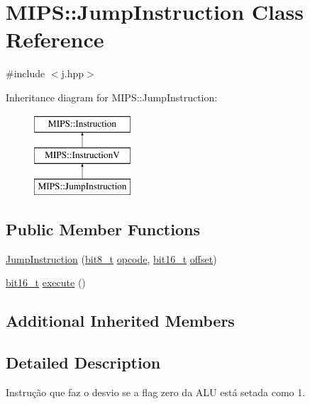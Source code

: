 \hypertarget{classMIPS_1_1JumpInstruction}{}\section{M\+I\+PS\+:\+:Jump\+Instruction Class Reference}
\label{classMIPS_1_1JumpInstruction}


{\ttfamily \#include $<$j.\+hpp$>$}

Inheritance diagram for M\+I\+PS\+:\+:Jump\+Instruction\+:\begin{figure}[H]
\begin{center}
\leavevmode
\includegraphics[height=3.000000cm]{classMIPS_1_1JumpInstruction}
\end{center}
\end{figure}
\subsection*{Public Member Functions}
\begin{DoxyCompactItemize}
\item 
\hyperlink{classMIPS_1_1JumpInstruction_a5688d5a7c2ded2c3b8a32cb395cb9db9}{Jump\+Instruction} (\hyperlink{core_8hpp_a6074bae122ae7b527864eec42c728c3c}{bit8\+\_\+t} \hyperlink{classMIPS_1_1Instruction_a45cc6808b5dde8a5d41067d148b55476}{opcode}, \hyperlink{core_8hpp_adc265a970bc35995b5879784bbb3f1b7}{bit16\+\_\+t} \hyperlink{classMIPS_1_1InstructionV_ac2e294fde4971aa6a149480f22ae29e9}{offset})
\item 
\hyperlink{core_8hpp_adc265a970bc35995b5879784bbb3f1b7}{bit16\+\_\+t} \hyperlink{classMIPS_1_1JumpInstruction_a843961af93d20e35dd1fab6bf341e16e}{execute} ()
\end{DoxyCompactItemize}
\subsection*{Additional Inherited Members}


\subsection{Detailed Description}
Instrução que faz o desvio se a flag zero da A\+LU está setada como 1.


